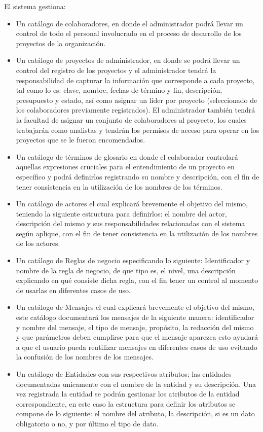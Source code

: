 \documentclass{article}
\begin{document}
\begin{multicols}{2}
	El sistema gestiona:
	
	\begin{itemize}
		\item Un catálogo de colaboradores, en donde el administrador podrá llevar un control de todo el personal involucrado en el proceso de desarrollo de los proyectos de la organización.
		\item Un catálogo de proyectos de administrador, en donde se podrá llevar un control del registro de los proyectos y el administrador tendrá la responsabilidad de capturar la información que corresponde a cada proyecto, tal como lo es: clave, nombre, fechas de término y fin, descripción, presupuesto y estado, así como asignar un líder por proyecto (seleccionado de los colaboradores previamente registrados).
		El administrador también tendrá la facultad de asignar un conjunto de colaboradores al proyecto, los cuales trabajarán como analistas y tendrán los permisos de acceso para operar en los proyectos que se le fueron encomendados.
		\item Un catálogo de términos de glosario en donde el colaborador controlará aquellas expresiones cruciales para el entendimiento de un proyecto en específico y podrá definirlos registrando su nombre y descripción, con el fin de tener consistencia en la utilización de los nombres de los términos.
		\item Un catálogo de actores el cual explicará brevemente el objetivo del mismo, teniendo la siguiente estructura para definirlos: el nombre del actor, descripción del mismo y sus responsabilidades relacionadas con el sistema según aplique, con el fin de tener consistencia en la utilización de los nombres de los actores.
		\item Un catálogo de Reglas de negocio especificando lo siguiente: Identificador y nombre de la regla de negocio, de que tipo es, el nivel, una descripción explicando en qué consiste dicha regla, con el fin tener un control al momento de usarlas en diferentes casos de uso.
		\item Un catálogo de Mensajes el cual explicará brevemente el objetivo del mismo, este catálogo documentará los mensajes de la siguiente manera: identificador y nombre del mensaje, el tipo de mensaje, propósito, la redacción del mismo y que parámetros deben cumplirse para que el mensaje aparezca esto ayudará a que el usuario pueda reutilizar mensajes en diferentes casos de uso evitando la confusión de los nombres de los mensajes.
		\item Un catálogo de Entidades con sus respectivos atributos; las entidades documentadas unicamente con el nombre de la entidad y su descripción. Una vez registrada la entidad se podrán gestionar los atributos de la entidad correspondiente, en este caso la estructura para definir los atributos se compone de lo siguiente: el nombre del atributo, la descripción, si es un dato obligatorio o no, y por último el tipo de dato.

\end{itemize}
\end{multicols}
\end{document}
